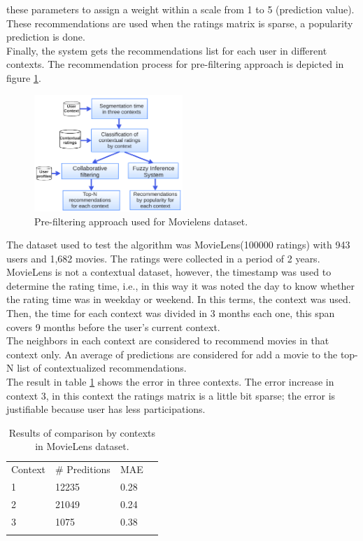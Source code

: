 these parameters to assign a weight within a scale from 1 to 5
(prediction value). These recommendations are used when the ratings
matrix is sparse, a popularity prediction is done. \\ Finally, the
system gets the recommendations list for each user in different
contexts. The recommendation process for pre-filtering approach
 is depicted in figure \ref{fig:archi-ml}.
\begin{figure}
\captionsetup{justification=centering,margin=2cm,font=footnotesize}
\centering
\setlength\fboxsep{0pt}
\includegraphics[width=0.50\textwidth]{img/archi-ml.png}
\caption{Pre-filtering approach used for Movielens dataset.}
\label{fig:archi-ml}     
\end{figure}
The dataset used to test the algorithm was MovieLens(100000 ratings)
with 943 users and 1,682 movies. The ratings were collected in a
period  of 2 years. \\MovieLens is not a contextual dataset, however,
the  timestamp was used to determine the rating time, i.e., in this
way it  was noted the day to know whether the rating time was in
weekday or  weekend. In this terms, the context was used. Then, the
time for each  context was divided in 3 months each one, this span
covers 9 months  before the user's current context. \\ The neighbors
in each context are  considered to recommend movies in that context
only.  An average of  predictions are considered for add a movie to
the top-N list of contextualized recommendations. \\ The result in
table \ref{tab:contexts} shows the error in three contexts. The
error increase in context 3, in this  context the ratings matrix is a
little bit sparse;  the error is  justifiable because user has less
participations.
\begin{table}
\small
\captionsetup{font=footnotesize}
\caption{Results of comparison by contexts in MovieLens dataset.}
\label{tab:contexts} 
\small
\centering
\begin{tabular}{llll}
\hline\noalign{\smallskip}
Context & \# Preditions & MAE &    \\
\noalign{\smallskip}\hline\noalign{\smallskip}
1 & 12235 & 0.28 \\
2 & 21049 & 0.24 \\
3 & 1075  & 0.38 \\
\noalign{\smallskip}\hline
\end{tabular}
\end{table}


